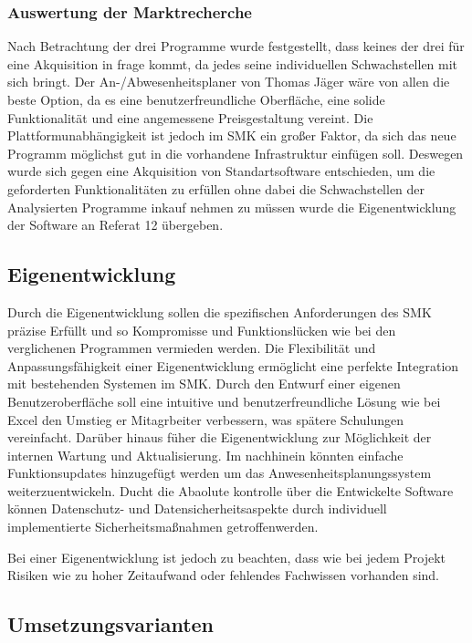 \subsubsection{Auswertung der Marktrecherche}
\label{sec:AuswertungMarktrecherche}
Nach Betrachtung der drei Programme wurde festgestellt, dass keines der drei für eine Akquisition in frage kommt, da jedes seine individuellen Schwachstellen mit sich bringt. Der An-/Abwesenheitsplaner von Thomas Jäger wäre von allen die beste Option, da es eine benutzerfreundliche Oberfläche, eine solide Funktionalität und eine angemessene Preisgestaltung vereint. Die Plattformunabhängigkeit ist jedoch im SMK ein großer Faktor, da sich das neue Programm möglichst gut in die vorhandene Infrastruktur einfügen soll. Deswegen wurde sich gegen eine Akquisition von Standartsoftware entschieden, um die geforderten Funktionalitäten zu erfüllen ohne dabei die Schwachstellen der Analysierten Programme inkauf nehmen zu müssen wurde die Eigenentwicklung der Software an Referat 12 übergeben.

\subsection{Eigenentwicklung}
\label{sec:Eigenentwicklung}

Durch die Eigenentwicklung sollen die spezifischen Anforderungen des SMK präzise Erfüllt und so Kompromisse und Funktionslücken wie bei den verglichenen Programmen vermieden werden. Die Flexibilität und Anpassungsfähigkeit einer Eigenentwicklung ermöglicht eine perfekte Integration mit bestehenden Systemen im SMK. Durch den Entwurf einer eigenen Benutzeroberfläche soll eine intuitive und benutzerfreundliche Lösung wie bei Excel den Umstieg er Mitagrbeiter verbessern, was spätere Schulungen vereinfacht. Darüber hinaus füher die Eigenentwicklung zur Möglichkeit der internen Wartung und Aktualisierung. Im nachhinein könnten einfache Funktionsupdates hinzugefügt werden um das Anwesenheitsplanungssystem weiterzuentwickeln. Ducht die Abaolute kontrolle über die Entwickelte Software können Datenschutz- und Datensicherheitsaspekte durch individuell implementierte Sicherheitsmaßnahmen getroffenwerden.

Bei einer Eigenentwicklung ist jedoch zu beachten, dass wie bei jedem Projekt Risiken wie zu hoher Zeitaufwand oder fehlendes Fachwissen vorhanden sind.


\subsection{Umsetzungsvarianten}
\label{sec:Umsetzungsvarianten}



